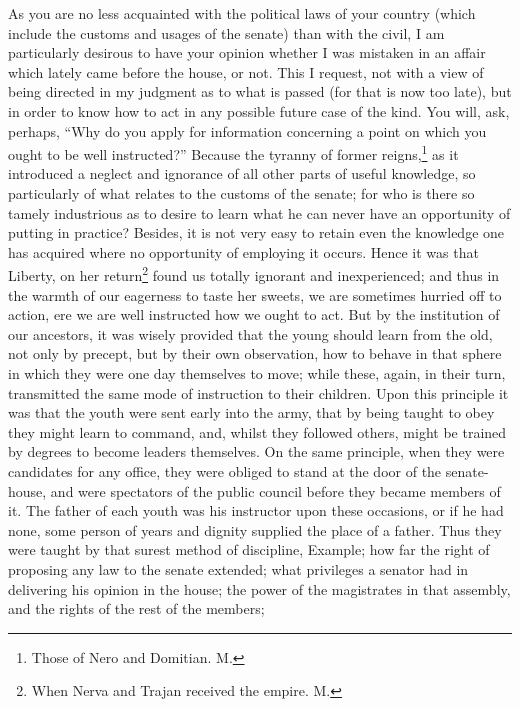 
As you are no less acquainted with the political laws of your country
(which include the customs and usages of the senate) than with the civil,
I am particularly desirous to have your opinion whether I was mistaken in
an affair which lately came before the house, or not. This I request, not
with a view of being directed in my judgment as to what is passed (for
that is now too late), but in order to know how to act in any possible
future case of the kind. You will, ask, perhaps, ``Why do you apply for
information concerning a point on which you ought to be well instructed?''
Because the tyranny of former reigns,\footnote{Those of Nero and
Domitian. M.} as it introduced a
neglect and ignorance of all other parts of useful knowledge, so
particularly of what relates to the customs of the senate; for who is
there so tamely industrious as to desire to learn what he can never have
an opportunity of putting in practice? Besides, it is not very easy to
retain even the knowledge one has acquired where no opportunity of
employing it occurs. Hence it was that Liberty, on her return\footnote{When Nerva and Trajan
received the empire. M.}
found us totally ignorant and inexperienced; and thus in the warmth of our
eagerness to taste her sweets, we are sometimes hurried off to action, ere
we are well instructed how we ought to act. But by the institution of our
ancestors, it was wisely provided that the young should learn from the
old, not only by precept, but by their own observation, how to behave in
that sphere in which they were one day themselves to move; while these,
again, in their turn, transmitted the same mode of instruction to their
children. Upon this principle it was that the youth were sent early into
the army, that by being taught to obey they might learn to command, and,
whilst they followed others, might be trained by degrees to become leaders
themselves. On the same principle, when they were candidates for any
office, they were obliged to stand at the door of the senate-house, and
were spectators of the public council before they became members of it.
The father of each youth was his instructor upon these occasions, or if he
had none, some person of years and dignity supplied the place of a father.
Thus they were taught by that surest method of discipline, Example; how
far the right of proposing any law to the senate extended; what privileges
a senator had in delivering his opinion in the house; the power of the
magistrates in that assembly, and the rights of the rest of the members;
